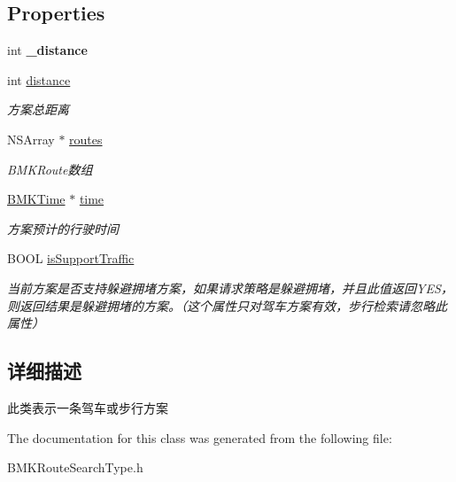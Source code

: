 \subsection*{Properties}
\begin{DoxyCompactItemize}
\item 
\hypertarget{interface_b_m_k_route_plan_afb7f5f3ff9b33d65172aaf4657d0d0d6}{int {\bfseries \-\_\-distance}}\label{interface_b_m_k_route_plan_afb7f5f3ff9b33d65172aaf4657d0d0d6}

\item 
\hypertarget{interface_b_m_k_route_plan_aa9020d0fe83a58c2192157f47d7930eb}{int \hyperlink{interface_b_m_k_route_plan_aa9020d0fe83a58c2192157f47d7930eb}{distance}}\label{interface_b_m_k_route_plan_aa9020d0fe83a58c2192157f47d7930eb}

\begin{DoxyCompactList}\small\item\em 方案总距离 \end{DoxyCompactList}\item 
\hypertarget{interface_b_m_k_route_plan_a93cd92070e92c4c1a25a8e127bd8b6d5}{N\-S\-Array $\ast$ \hyperlink{interface_b_m_k_route_plan_a93cd92070e92c4c1a25a8e127bd8b6d5}{routes}}\label{interface_b_m_k_route_plan_a93cd92070e92c4c1a25a8e127bd8b6d5}

\begin{DoxyCompactList}\small\item\em B\-M\-K\-Route数组 \end{DoxyCompactList}\item 
\hypertarget{interface_b_m_k_route_plan_a7a9c75c4bd6030b7db60bc320b537077}{\hyperlink{interface_b_m_k_time}{B\-M\-K\-Time} $\ast$ \hyperlink{interface_b_m_k_route_plan_a7a9c75c4bd6030b7db60bc320b537077}{time}}\label{interface_b_m_k_route_plan_a7a9c75c4bd6030b7db60bc320b537077}

\begin{DoxyCompactList}\small\item\em 方案预计的行驶时间 \end{DoxyCompactList}\item 
\hypertarget{interface_b_m_k_route_plan_a0e2d9ca39e9f21cd34460aa6d0044667}{B\-O\-O\-L \hyperlink{interface_b_m_k_route_plan_a0e2d9ca39e9f21cd34460aa6d0044667}{is\-Support\-Traffic}}\label{interface_b_m_k_route_plan_a0e2d9ca39e9f21cd34460aa6d0044667}

\begin{DoxyCompactList}\small\item\em 当前方案是否支持躲避拥堵方案，如果请求策略是躲避拥堵，并且此值返回\-Y\-E\-S，则返回结果是躲避拥堵的方案。（这个属性只对驾车方案有效，步行检索请忽略此属性） \end{DoxyCompactList}\end{DoxyCompactItemize}


\subsection{详细描述}
此类表示一条驾车或步行方案 

The documentation for this class was generated from the following file\-:\begin{DoxyCompactItemize}
\item 
B\-M\-K\-Route\-Search\-Type.\-h\end{DoxyCompactItemize}

